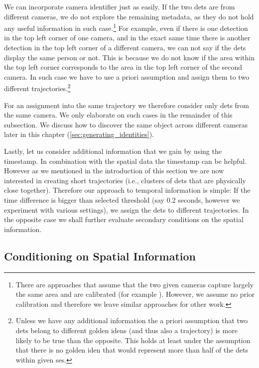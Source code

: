 We can incorporate camera identifier just as easily. If the two
\glspl{det} are from different cameras, we do not explore the remaining
metadata, as they do not hold any useful information in such
case.\footnote{There
are approaches that assume that the two given cameras capture largely the same
area and are calibrated (for example \cite{hu2006principal}). However, we
assume no prior calibration and therefore we leave similar approaches for other
work.} For example, even if there is one detection in the top left corner of one
camera, and in the exact same time there is another detection in the top left corner
of a different camera, we can not say if the \glspl{det}
display the same person or not. This is
because we do not know if the area within the top left corner corresponds to the
area in the top left corner of the second camera. In such case we have to use
a priori assumption and assign them to two different
trajectories.\footnote{Unless we have any additional information the a priori
assumption that two \glspl{det} belong to different golden \glspl{iden} (and thus also a trajectory) is more
likely to be true than the opposite. This holds at least under the assumption that there is no
golden \gls{iden} that would represent more than half of the
\glspl{det} within given \gls{ses}.}

For an assignment into the same trajectory we therefore consider only \glspl{det}
from the same camera. We only elaborate on such cases in the remainder
of this subsection. We discuss how to discover the same object across
different cameras later in this chapter (\autoref{sec:generating_identities}).

Lastly, let us consider additional information that we gain by using the timestamp.
In combination with the spatial data the timestamp can be helpful. However as
we mentioned in the introduction of this section
we are now interested in creating short trajectories (i.e., clusters of
\glspl{det} that are physically close together). Therefore
our approach to temporal information is simple: If the time difference is
bigger than selected threshold (say 0.2 seconds, however we experiment with
various settings), we assign the \glspl{det} to different trajectories. In the
opposite case we shall further evaluate secondary conditions on the spatial
information.

\subsection{Conditioning on Spatial Information}

